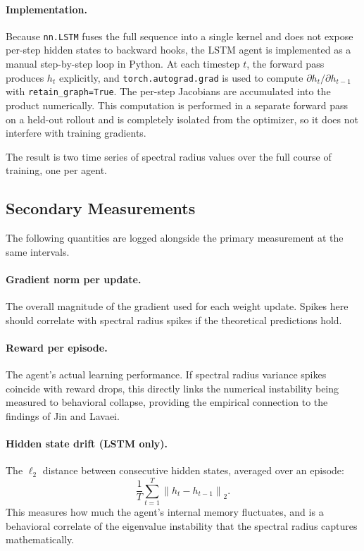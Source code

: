 \documentclass[11pt,a4paper]{article}
\begin{document}
\paragraph{Implementation.}
Because \texttt{nn.LSTM} fuses the full sequence into a single kernel and does not expose per-step hidden states to backward hooks, the LSTM agent is implemented as a manual step-by-step loop in Python. At each timestep $t$, the forward pass produces $h_t$ explicitly, and \texttt{torch.autograd.grad} is used to compute $\partial h_t / \partial h_{t-1}$ with \texttt{retain\_graph=True}. The per-step Jacobians are accumulated into the product numerically. This computation is performed in a separate forward pass on a held-out rollout and is completely isolated from the optimizer, so it does not interfere with training gradients.

The result is two time series of spectral radius values over the full course of training, one per agent.

\subsection{Secondary Measurements}

The following quantities are logged alongside the primary measurement at the same intervals.

\paragraph{Gradient norm per update.}
The overall magnitude of the gradient used for each weight update. Spikes here should correlate with spectral radius spikes if the theoretical predictions hold.

\paragraph{Reward per episode.}
The agent's actual learning performance. If spectral radius variance spikes coincide with reward drops, this directly links the numerical instability being measured to behavioral collapse, providing the empirical connection to the findings of Jin and Lavaei.

\paragraph{Hidden state drift (LSTM only).}
The $\ell_2$ distance between consecutive hidden states, averaged over an episode:
\begin{equation}
  \frac{1}{T} \sum_{t=1}^{T} \left\lVert h_t - h_{t-1} \right\rVert_2.
\end{equation}
This measures how much the agent's internal memory fluctuates, and is a behavioral correlate of the eigenvalue instability that the spectral radius captures mathematically.
\end{document}
